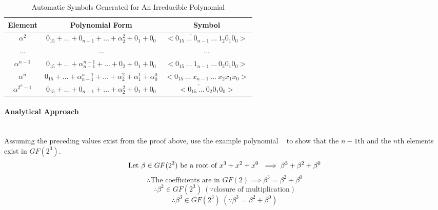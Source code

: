    \begin{table}[h]
        \def\arraystretch{2.5}
        \caption{Automatic Symbols Generated for An Irreducible Polynomial}
        \centering
        \begin{tabular*}{450pt}{@{\extracolsep{\fill}} ccc}

        \textbf{Element} & \textbf{Polynomial Form} & \textbf{Symbol}
        \\
        \hline

        $\alpha^{2}$ & $0_{15} + \ldots + 0_{n-1} + \ldots +
        \alpha^{2}_{2} + 0_{1} + 0_{0}$ & $< \overleftarrow{0_{15} \ \ldots \
        0_{n-1}} \ \ldots \ 1_{2} 0_{1} 0_{0} >$ \\

        $\ldots$ & $\ldots$ & $\ldots$ \\

        $\alpha^{n-1}$ & $0_{15} + \ldots + \alpha^{n-1}_{n-1} + \ldots
        + 0_{2} + 0_{1} + 0_{0}$ & $< 0_{15} \ \ldots \ 1_{n-1} \ \ldots \
          0_{2} 0_{1} 0_{0} >$ \\

        $\alpha^{n}$ & $0_{15} + \ldots + \alpha^{n-1}_{n-1} + \ldots
        +\alpha^{2}_{2} + \alpha^{1}_{1} + \alpha^{0}_{0}$ & $< 0_{15} \ 
        \ldots \ x_{n-1} \ \ldots \ x_{2} x_{1} x_{0} >$ \\

        $\alpha^{2^{n}-1}$ & $0_{15} + \ldots + 0_{n-1} + \ldots +
        \alpha^{2}_{2} + 0_{1} + 0_{0}$ & $< \overleftarrow{0_{15} \ \ldots \
        0_{2}} 0_{1} 0_{0} >$ \\

        \end{tabular*}
        \label{table:auto_sym}
    \end{table}

        \paragraph{Analytical Approach} \leavevmode \\ Assuming the preceding
        values exist from the proof above, use the example polynomial
        \examplepoly~ to show that the $n-1$th and the $n$th elements exist in
        $GF(2^{3})$.
        \[ \text{Let } \beta \in GF(2^{3}) \text{ be a root of
        $x^{3}+x^{2}+x^{0}$~} \implies \beta^{3} + \beta^{2} + \beta^{0} \]
        \[ \therefore \text{The coefficients are in } GF(2) \implies
        \beta^{3} = \beta^{2} + \beta^{0} \]
        \[ \therefore \beta^{2} \in GF(2^{3}) \ (\because \text{
        closure of  multiplication}) \]
        \[ \therefore \beta^{3} \in GF(2^{3}) \ (\because \beta^{3} =
        \beta^{2} + \beta^{0}) \]

